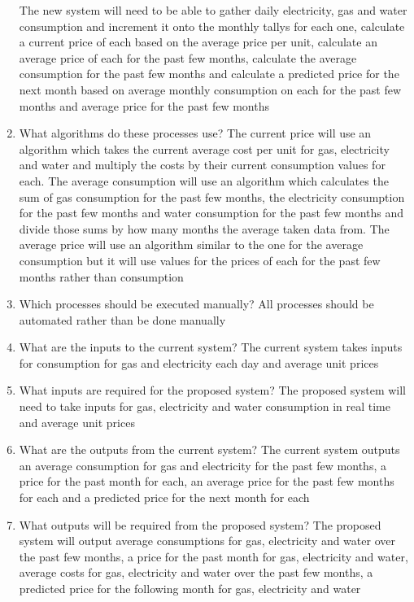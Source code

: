 \begin{enumerate}
The new system will need to be able to gather daily electricity, gas and water consumption and increment it onto the monthly tallys for each one, calculate a current price of each based on the average price per unit, calculate an average price of each for the past few months, calculate the average consumption for the past few months and calculate a predicted price for the next month based on average monthly consumption on each for the past few months and average price for the past few months
	\item What algorithms do these processes use?
The current price will use an algorithm which takes the current average cost per unit for gas, electricity and water and multiply the costs by their current consumption values for each.
The average consumption will use an algorithm which calculates the sum of gas consumption for the past few months, the electricity consumption for the past few months and water consumption for the past few months and divide those sums by how many months the average taken data from. 
The average price will use an algorithm similar to the one for the average consumption but it will use values for the prices of each for the past few months rather than consumption
	\item Which processes should be executed manually?
All processes should be automated rather than be done manually
	\item What are the inputs to the current system?
The current system takes inputs for consumption for gas and electricity each day and average unit prices
	\item What inputs are required for the proposed system?
The proposed system will need to take inputs for gas, electricity and water consumption in real time and average unit prices
	\item What are the outputs from the current system?
The current system outputs an average consumption for gas and electricity for the past few months, a price for the past month for each, an average price for the past few months for each and a predicted price for the next month for each
	\item What outputs will be required from the proposed system?
The proposed system will output average consumptions for gas, electricity and water over the past few months, a price for the past month for gas, electricity and water, average costs for gas, electricity and water over the past few months, a predicted price for the following month for gas, electricity and water
\end{enumerate}

